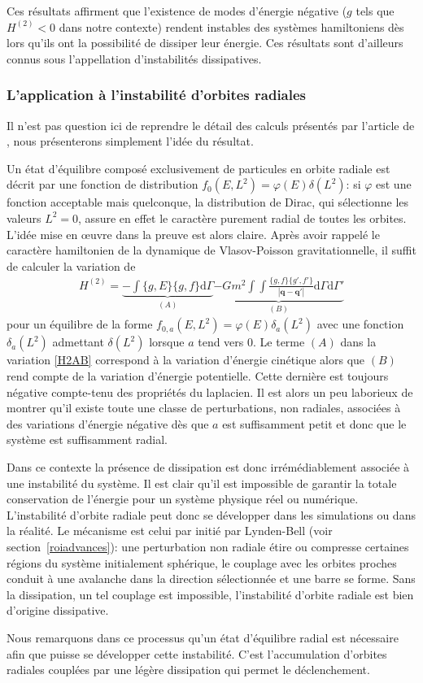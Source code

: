Ces résultats affirment que l'existence de modes d'énergie négative ($g$ tels que $H^{(2)}<0$ dans notre contexte) rendent instables des systèmes
hamiltoniens dès lors qu'ils ont la possibilité de dissiper leur énergie. Ces résultats sont d'ailleurs connus sous l'appellation \og d'instabilités
dissipatives\fg.



\subsubsection{L'application à l'instabilité d'orbites radiales}

Il n'est pas question ici de reprendre le détail des calculs présentés par l'article de \cite{future}, nous présenterons
simplement l'idée du résultat.

Un état d'équilibre composé exclusivement de particules en orbite radiale est décrit par une fonction de distribution $f_0(E,L^2) = \varphi(E)
\delta(L^2)$: si $\varphi$ est une fonction acceptable mais quelconque, la distribution de Dirac, qui sélectionne les valeurs $L^2=0$,  assure en
effet le caractère purement radial de toutes les orbites. L'idée mise en œuvre dans la preuve est alors claire. Après avoir rappelé le caractère
hamiltonien de la dynamique de Vlasov-Poisson gravitationnelle, il suffit de calculer la variation de
\begin{align}
	H^{(2)} =
	\underbrace{- \int \{g,E\} \{g,f\} \mathrm{d} \Gamma}_{(A)}
	\underbrace{- G m^2 %
		\int\!\!\!\int \frac{\{g,f\}\{g',f'\}}{|\mathbf{q} - \mathbf{q'}|}
		\mathrm{d} \Gamma \mathrm{d} \Gamma'}_{(B)}
		\label{H2AB}
\end{align}
pour un équilibre de la forme $f_{0,a}(E,L^2) = \varphi(E) \delta_a (L^2)$ avec une fonction $\delta_a (L^2)$ admettant $\delta(L^2)$ lorsque $a$ tend
vers $0$. Le terme $(A)$ dans la variation \ref{H2AB} correspond à la variation d'énergie cinétique alors que $(B)$ rend compte de la variation
d'énergie potentielle. Cette dernière est toujours négative compte-tenu des propriétés du laplacien. Il est alors un peu laborieux de montrer qu'il
existe toute une classe de perturbations, non radiales, associées à des variations d'énergie négative dès que $a$ est suffisamment petit et donc que
le système est suffisamment radial.

Dans ce contexte la présence de dissipation est donc irrémédiablement associée à une instabilité du système. Il est clair qu'il est impossible de
garantir la totale conservation de l'énergie pour un système physique réel ou numérique. L'instabilité d'orbite radiale peut donc se développer dans
les simulations ou dans la réalité. Le mécanisme est celui par initié par Lynden-Bell (voir section~\ref{roiadvances}): une perturbation non
radiale étire ou compresse certaines régions du système initialement sphérique, le couplage avec les orbites proches conduit à une avalanche dans la
direction sélectionnée et une barre se forme. Sans la dissipation, un tel couplage est impossible, l'instabilité d'orbite radiale est bien d'origine
dissipative.

Nous remarquons dans ce processus qu'un état d'équilibre radial est nécessaire afin que puisse se développer cette instabilité. C'est l'accumulation
d'orbites radiales couplées par une légère dissipation qui permet le déclenchement.




